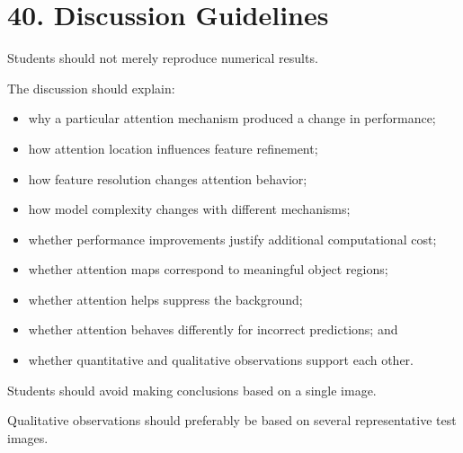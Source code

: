 \documentclass[10pt]{article}
\begin{document}
\section*{40. Discussion Guidelines}

Students should not merely reproduce numerical results.

The discussion should explain:

\begin{itemize}

\item why a particular attention mechanism produced a change in performance;

\item how attention location influences feature refinement;

\item how feature resolution changes attention behavior;

\item how model complexity changes with different mechanisms;

\item whether performance improvements justify additional computational cost;

\item whether attention maps correspond to meaningful object regions;

\item whether attention helps suppress the background;

\item whether attention behaves differently for incorrect predictions; and

\item whether quantitative and qualitative observations support each other.

\end{itemize}

Students should avoid making conclusions based on a single image.

Qualitative observations should preferably be based on several representative
test images.
\end{document}
